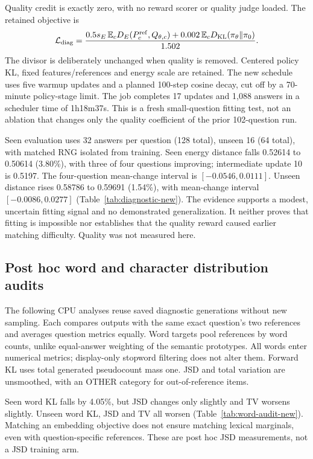 Quality credit is exactly zero, with no reward scorer or quality judge
loaded. The retained objective is
\begin{equation}
 \mathcal L_{\mathrm{diag}}=
 \frac{0.5s_E\,\mathbb{E}_c D_E(P_c^{\mathrm{ref}},Q_{\theta,c})
      +0.002\,\mathbb{E}_cD_{\mathrm{KL}}(\pi_\theta\Vert\pi_0)}{1.502}.
 \label{eq:diagnosticloss}
\end{equation}
The divisor is deliberately unchanged when quality is removed. Centered
policy KL, fixed features/references and energy scale are retained.
The new schedule uses five warmup updates and a planned 100-step cosine
decay, cut off by a 70-minute policy-stage limit. The job completes
17 updates and 1,088 answers in a scheduler time of 1h18m37s.
This is a fresh small-question fitting test, not an ablation that changes
only the quality coefficient of the prior 102-question run.

Seen evaluation uses 32 answers per question (128 total), unseen 16
(64 total), with matched RNG isolated from training.
Seen energy distance falls 0.52614 to 0.50614 (3.80\%), with three of
four questions improving; intermediate update 10 is 0.5197.
The four-question mean-change interval is $[-0.0546,0.0111]$.
Unseen distance rises 0.58786 to 0.59691 (1.54\%), with mean-change
interval $[-0.0086,0.0277]$ (Table~\ref{tab:diagnostic-new}).
The evidence supports a modest, uncertain fitting signal and no
demonstrated generalization. It neither proves that fitting is
impossible nor establishes that the quality reward caused earlier
matching difficulty. Quality was not measured here.


\subsection{Post hoc word and character distribution audits}
The following CPU analyses reuse saved diagnostic generations without
new sampling. Each compares outputs with the same exact question's
two references and averages question metrics equally. Word targets
pool references by word counts, unlike equal-answer weighting of the
semantic prototypes. All words enter numerical metrics; display-only
stopword filtering does not alter them. Forward KL uses total generated
pseudocount mass one. JSD and total variation are unsmoothed, with
an OTHER category for out-of-reference items.



Seen word KL falls by 4.05\%, but JSD changes only slightly and TV
worsens slightly. Unseen word KL, JSD and TV all worsen
(Table~\ref{tab:word-audit-new}). Matching an embedding objective does
not ensure matching lexical marginals, even with question-specific
references. These are post hoc JSD measurements, not a JSD training arm.

